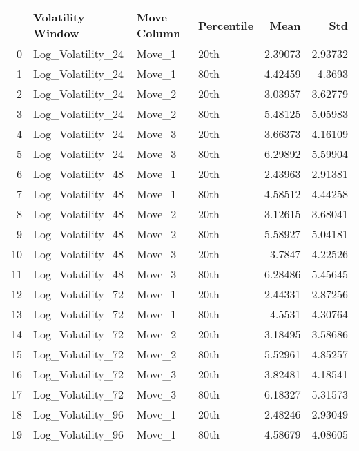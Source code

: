 \begin{tabular}{rlllrr}
\hline
    & Volatility Window   & Move Column   & Percentile   &    Mean &     Std \\
\hline
  0 & Log\_Volatility\_24   & Move\_1        & 20th         & 2.39073 & 2.93732 \\
  1 & Log\_Volatility\_24   & Move\_1        & 80th         & 4.42459 & 4.3693  \\
  2 & Log\_Volatility\_24   & Move\_2        & 20th         & 3.03957 & 3.62779 \\
  3 & Log\_Volatility\_24   & Move\_2        & 80th         & 5.48125 & 5.05983 \\
  4 & Log\_Volatility\_24   & Move\_3        & 20th         & 3.66373 & 4.16109 \\
  5 & Log\_Volatility\_24   & Move\_3        & 80th         & 6.29892 & 5.59904 \\
  6 & Log\_Volatility\_48   & Move\_1        & 20th         & 2.43963 & 2.91381 \\
  7 & Log\_Volatility\_48   & Move\_1        & 80th         & 4.58512 & 4.44258 \\
  8 & Log\_Volatility\_48   & Move\_2        & 20th         & 3.12615 & 3.68041 \\
  9 & Log\_Volatility\_48   & Move\_2        & 80th         & 5.58927 & 5.04181 \\
 10 & Log\_Volatility\_48   & Move\_3        & 20th         & 3.7847  & 4.22526 \\
 11 & Log\_Volatility\_48   & Move\_3        & 80th         & 6.28486 & 5.45645 \\
 12 & Log\_Volatility\_72   & Move\_1        & 20th         & 2.44331 & 2.87256 \\
 13 & Log\_Volatility\_72   & Move\_1        & 80th         & 4.5531  & 4.30764 \\
 14 & Log\_Volatility\_72   & Move\_2        & 20th         & 3.18495 & 3.58686 \\
 15 & Log\_Volatility\_72   & Move\_2        & 80th         & 5.52961 & 4.85257 \\
 16 & Log\_Volatility\_72   & Move\_3        & 20th         & 3.82481 & 4.18541 \\
 17 & Log\_Volatility\_72   & Move\_3        & 80th         & 6.18327 & 5.31573 \\
 18 & Log\_Volatility\_96   & Move\_1        & 20th         & 2.48246 & 2.93049 \\
 19 & Log\_Volatility\_96   & Move\_1        & 80th         & 4.58679 & 4.08605 \\

\end{tabular}
